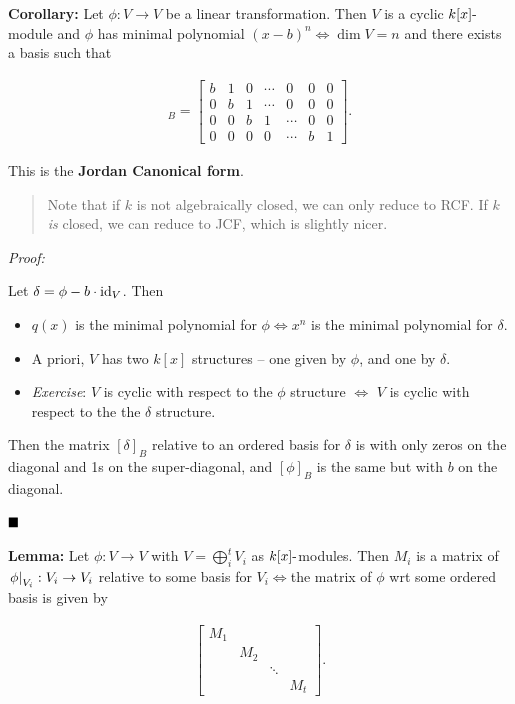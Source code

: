 \textbf{Corollary:} Let \(\phi: V\to V\) be a linear transformation.
Then \(V\) is a cyclic \(k[x]{\hbox{-}}\)module and \(\phi\) has minimal
polynomial \((x-b)^n \iff \dim V = n\) and there exists a basis such
that

\begin{align*}
[\phi]_B = \left[\begin{array}{ccccccc}
b & 1 & 0   & \cdots  & 0       & 0 & 0\\
0 & b & 1   & \cdots  & 0       & 0 & 0\\
0 & 0 & b   & 1       &\cdots   & 0 & 0\\
0 & 0 & 0   & 0       & \cdots  & b & 1
\end{array}\right]
.\end{align*}

This is the \textbf{Jordan Canonical form}.

\begin{quote}
Note that if \(k\) is not algebraically closed, we can only reduce to
RCF. If \(k\) \emph{is} closed, we can reduce to JCF, which is slightly
nicer.
\end{quote}

\emph{Proof:}

Let \(\delta = \phi - b \cdot\text{id}_V\). Then

\begin{itemize}
\item
  \(q(x)\) is the minimal polynomial for \(\phi \iff x^n\) is the
  minimal polynomial for \(\delta\).
\item
  A priori, \(V\) has two \(k[x]\) structures -- one given by \(\phi\),
  and one by \(\delta\).
\item
  \emph{Exercise}: \(V\) is cyclic with respect to the \(\phi\)
  structure \(\iff\) \(V\) is cyclic with respect to the the \(\delta\)
  structure.
\end{itemize}

Then the matrix \([\delta]_B\) relative to an ordered basis for
\(\delta\) is with only zeros on the diagonal and 1s on the
super-diagonal, and \([\phi]_B\) is the same but with \(b\) on the
diagonal.

\(\qed\)

\textbf{Lemma:} Let \(\phi: V\to V\) with \(V = \bigoplus_i^t V_i\) as
\(k[x]{\hbox{-}}\)modules. Then \(M_i\) is a matrix of
\({\left.{\phi}\right|_{V_i}}: V_i \to V_i\) relative to some basis for
\(V_i \iff\)the matrix of \(\phi\) wrt some ordered basis is given by

\begin{align*}
\left[
\begin{array}{cccc}
M_1 &  & & \\
& M_2 & & \\
& & \ddots & \\
& & & M_t
\end{array}\right]
.\end{align*}

